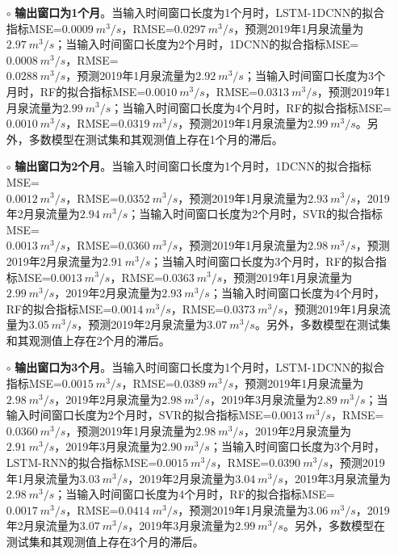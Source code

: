 \begin{enumerate}
  \begin{itemize}
    \item[$\circ$] \textbf{输出窗口为1个月}。当输入时间窗口长度为1个月时，LSTM-1DCNN的拟合指标MSE=$\SI{0.0009}{m^{3}/s}$，RMSE=$\SI{0.0297}{m^{3}/s}$，预测2019年1月泉流量为$\SI{2.97}{m^{3}/s}$；当输入时间窗口长度为2个月时，1DCNN的拟合指标MSE=$\SI{0.0008}{m^{3}/s}$，RMSE=\\$\SI{0.0288}{m^{3}/s}$，预测2019年1月泉流量为$\SI{2.92}{m^{3}/s}$；当输入时间窗口长度为3个月时，RF的拟合指标MSE=$\SI{0.0010}{m^{3}/s}$，RMSE=$\SI{0.0313}{m^{3}/s}$，预测2019年1月泉流量为$\SI{2.99}{m^{3}/s}$；当输入时间窗口长度为4个月时，RF的拟合指标MSE=$\SI{0.0010}{m^{3}/s}$，RMSE=$\SI{0.0319}{m^{3}/s}$，预测2019年1月泉流量为$\SI{2.99}{m^{3}/s}$。另外，多数模型在测试集和其观测值上存在1个月的滞后。
    \item[$\circ$] \textbf{输出窗口为2个月}。当输入时间窗口长度为1个月时，1DCNN的拟合指标MSE=\\$\SI{0.0012}{m^{3}/s}$，RMSE=$\SI{0.0352}{m^{3}/s}$，预测2019年1月泉流量为$\SI{2.93}{m^{3}/s}$，2019年2月泉流量为$\SI{2.94}{m^{3}/s}$；当输入时间窗口长度为2个月时，SVR的拟合指标MSE=\\$\SI{0.0013}{m^{3}/s}$，RMSE=$\SI{0.0360}{m^{3}/s}$，预测2019年1月泉流量为$\SI{2.98}{m^{3}/s}$，预测2019年2月泉流量为$\SI{2.91}{m^{3}/s}$；当输入时间窗口长度为3个月时，RF的拟合指标MSE=$\SI{0.0013}{m^{3}/s}$，RMSE=$\SI{0.0363}{m^{3}/s}$，预测2019年1月泉流量为$\SI{2.99}{m^{3}/s}$，2019年2月泉流量为$\SI{2.93}{m^{3}/s}$；当输入时间窗口长度为4个月时，RF的拟合指标MSE=$\SI{0.0014}{m^{3}/s}$，RMSE=$\SI{0.0373}{m^{3}/s}$，预测2019年1月泉流量为$\SI{3.05}{m^{3}/s}$，预测2019年2月泉流量为$\SI{3.07}{m^{3}/s}$。另外，多数模型在测试集和其观测值上存在2个月的滞后。
    \item[$\circ$] \textbf{输出窗口为3个月}。当输入时间窗口长度为1个月时，LSTM-1DCNN的拟合指标MSE=$\SI{0.0015}{m^{3}/s}$，RMSE=$\SI{0.0389}{m^{3}/s}$，预测2019年1月泉流量为$\SI{2.98}{m^{3}/s}$，2019年2月泉流量为$\SI{2.98}{m^{3}/s}$，2019年3月泉流量为$\SI{2.89}{m^{3}/s}$；当输入时间窗口长度为2个月时，SVR的拟合指标MSE=$\SI{0.0013}{m^{3}/s}$，RMSE=$\SI{0.0360}{m^{3}/s}$，预测2019年1月泉流量为$\SI{2.98}{m^{3}/s}$，2019年2月泉流量为$\SI{2.91}{m^{3}/s}$，2019年3月泉流量为$\SI{2.90}{m^{3}/s}$；当输入时间窗口长度为3个月时，LSTM-RNN的拟合指标MSE=$\SI{0.0015}{m^{3}/s}$，RMSE=$\SI{0.0390}{m^{3}/s}$，预测2019年1月泉流量为$\SI{3.03}{m^{3}/s}$，2019年2月泉流量为$\SI{3.04}{m^{3}/s}$，2019年3月泉流量为$\SI{2.98}{m^{3}/s}$；当输入时间窗口长度为4个月时，RF的拟合指标MSE=$\SI{0.0017}{m^{3}/s}$，RMSE=$\SI{0.0414}{m^{3}/s}$，预测2019年1月泉流量为$\SI{3.06}{m^{3}/s}$，2019年2月泉流量为$\SI{3.07}{m^{3}/s}$，2019年3月泉流量为$\SI{2.99}{m^{3}/s}$。另外，多数模型在测试集和其观测值上存在3个月的滞后。

\end{itemize}
\end{enumerate}
